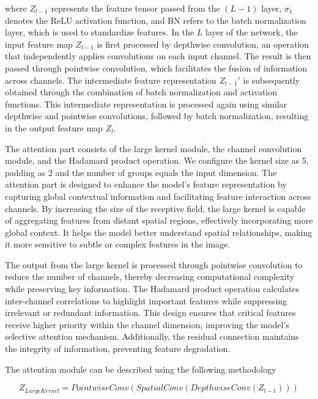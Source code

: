 \documentclass[sn-mathphys-num]{sn-jnl}
\theoremstyle{thmstyleone}%
\theoremstyle{thmstyletwo}%
\theoremstyle{thmstylethree}%
\begin{document}
where \(Z_{l-1}\) represents the feature tensor passed from the \(\left(L-1\right)\) layer, \(\sigma_1\) denotes the ReLU activation function, and BN refers to the batch normalization layer, which is used to standardize features.
In the \(L\) layer of the network, the input feature map \(Z_{l-1}\) is first processed by depthwise convolution, an operation that independently applies convolutions on each input channel.
The result is then passed through pointwise convolution, which facilitates the fusion of information across channels. 
The intermediate feature representation \(Z_{l-1}'\) is subsequently obtained through the combination of batch normalization and activation functions.
This intermediate representation is processed again using similar depthwise and pointwise convolutions, followed by batch normalization, resulting in the output feature map \(Z_{l}\).

The attention part consists of the large kernel module, the channel convolution module, and the Hadamard product operation.
We configure the kernel size as 5, padding as 2 and the number of groups equals the input dimension.
The attention part is designed to enhance the model's feature representation by capturing global contextual information and facilitating feature interaction across channels.
By increasing the size of the receptive field, the large kernel is capable of aggregating features from distant spatial regions, effectively incorporating more global context.
It helps the model better understand spatial relationships, making it more sensitive to subtle or complex features in the image.

The output from the large kernel is processed through pointwise convolution to reduce the number of channels, thereby decreasing computational complexity while preserving key information.
The Hadamard product operation calculates inter-channel correlations to highlight important features while suppressing irrelevant or redundant information.
This design ensures that critical features receive higher priority within the channel dimension, improving the model's selective attention mechanism.
Additionally, the residual connection maintains the integrity of information, preventing feature degradation.

The attention module can be described using the following methodology

\begin{equation}
    Z_{LargeKernel} = PointwiseConv\left(SpatialConv\left(DepthwiseConv\left(Z_{l-1}\right)\right)\right)
\end{equation}
\end{document}
